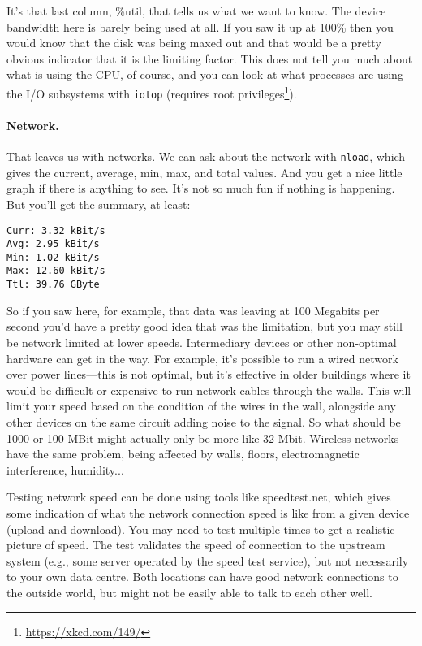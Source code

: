 It's that last column, \%util, that tells us what we want to know. The device bandwidth here is barely being used at all. If you saw it up at 100\% then you would know that the disk was being maxed out and that would be a pretty obvious indicator that it is the limiting factor. This does not tell you much about what is using the CPU, of course, and you can look at what processes are using the I/O subsystems with \texttt{iotop} (requires root privileges\footnote{\url{https://xkcd.com/149/}}).

\paragraph{Network.} That leaves us with networks. We can ask about the network with \texttt{nload}, which gives the current, average, min, max, and total values. And you get a nice little graph if there is anything to see. It's not so much fun if nothing is happening. But you'll get the summary, at least:

\vspace*{-1em}
{\scriptsize
\begin{verbatim}
Curr: 3.32 kBit/s
Avg: 2.95 kBit/s
Min: 1.02 kBit/s
Max: 12.60 kBit/s
Ttl: 39.76 GByte
\end{verbatim}
} \vspace*{-1em}

So if you saw here, for example, that data was leaving at 100 Megabits per second you'd have a pretty good idea that was the limitation, but you may still be network limited at lower speeds. Intermediary devices or other non-optimal hardware can get in the way. For example, it's possible to run a wired network over power lines---this is not optimal, but it's effective in older buildings where it would be difficult or expensive to run network cables through the walls. This will limit your speed based on the condition of the wires in the wall, alongside any other devices on the same circuit adding noise to the signal. So what should be 1000 or 100 MBit might actually only be more like 32 Mbit. Wireless networks have the same problem, being affected by walls, floors, electromagnetic interference, humidity...

Testing network speed can be done using tools like speedtest.net, which gives some indication of what the network connection speed is like from a given device (upload and download). You may need to test multiple times to get a realistic picture of speed. The test validates the speed of connection to the upstream system (e.g., some server operated by the speed test service), but not necessarily to your own data centre. Both locations can have good network connections to the outside world, but might not be easily able to talk to each other well.

